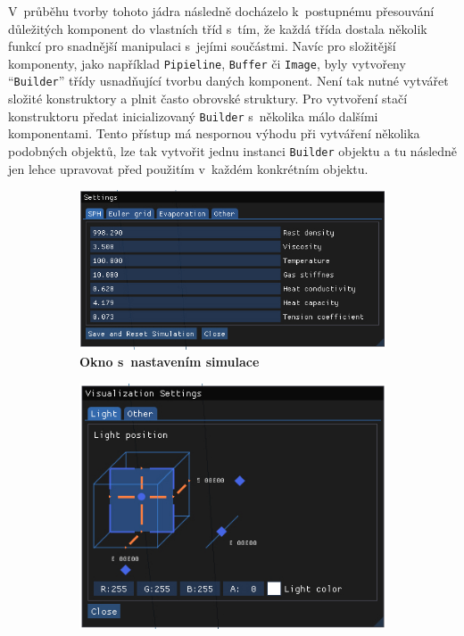 V~průběhu tvorby tohoto jádra následně docházelo k~postupnému přesouvání důležitých komponent do vlastních tříd s~tím, že každá třída dostala několik funkcí pro snadnější manipulaci s~jejími součástmi. Navíc pro složitější komponenty, jako například \texttt{Pipieline}, \texttt{Buffer} či \texttt{Image}, byly vytvořeny \enquote{\texttt{Builder}} třídy usnadňující tvorbu daných komponent. Není tak nutné vytvářet složité konstruktory a plnit často obrovské struktury. Pro vytvoření stačí konstruktoru předat inicializovaný \texttt{Builder} s~několika málo dalšími komponentami. Tento přístup má nespornou výhodu při vytváření několika podobných objektů, lze tak vytvořit jednu instanci \texttt{Builder} objektu a tu následně jen lehce upravovat před použitím v~každém konkrétním objektu.


\begin{figure}[h]
	\centering
	\captionsetup{justification=centering}
	\begin{subfigure}[t]{.49\textwidth}
		\centering
		\includegraphics[scale=1]{obrazky-figures/SimSett.jpg}
		\caption{\textbf{Okno s~nastavením simulace}}
		\label{fig:simSett}
	\end{subfigure}
		\begin{subfigure}[t]{.49\textwidth}
		\centering
		\includegraphics[scale=1]{obrazky-figures/VisualSettings.jpg}

\end{subfigure}
\end{figure}
